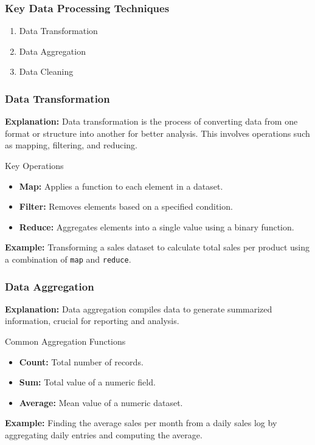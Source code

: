 \documentclass[aspectratio=169]{beamer}
\begin{document}
\begin{frame}[fragile]
    \frametitle{Key Data Processing Techniques}
    \begin{enumerate}
        \item Data Transformation
        \item Data Aggregation
        \item Data Cleaning
    \end{enumerate}
\end{frame}

\begin{frame}[fragile]
    \frametitle{Data Transformation}
    \textbf{Explanation:} Data transformation is the process of converting data from one format or structure into another for better analysis. This involves operations such as mapping, filtering, and reducing.

    \begin{block}{Key Operations}
        \begin{itemize}
            \item \textbf{Map:} Applies a function to each element in a dataset.
            \item \textbf{Filter:} Removes elements based on a specified condition.
            \item \textbf{Reduce:} Aggregates elements into a single value using a binary function.
        \end{itemize}
    \end{block}

    \textbf{Example:} Transforming a sales dataset to calculate total sales per product using a combination of \texttt{map} and \texttt{reduce}.
\end{frame}

\begin{frame}[fragile]
    \frametitle{Data Aggregation}
    \textbf{Explanation:} Data aggregation compiles data to generate summarized information, crucial for reporting and analysis.

    \begin{block}{Common Aggregation Functions}
        \begin{itemize}
            \item \textbf{Count:} Total number of records.
            \item \textbf{Sum:} Total value of a numeric field.
            \item \textbf{Average:} Mean value of a numeric dataset.
        \end{itemize}
    \end{block}

    \textbf{Example:} Finding the average sales per month from a daily sales log by aggregating daily entries and computing the average.
\end{frame}
\end{document}
